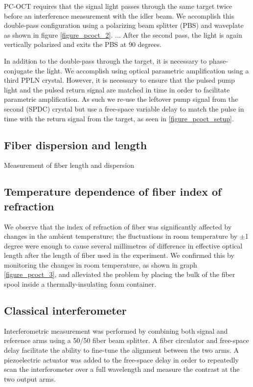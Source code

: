 PC-OCT requires that the signal light passes through the same target twice before an interference measurement with the idler beam. We accomplish this double-pass configuration using a polarizing beam splitter (PBS) and waveplate as shown in figure \ref{figure_pcoct_2}.
...
After the second pass, the light is again vertically polarized and exits the PBS at 90 degrees.

In addition to the double-pass through the target, it is necessary to phase-conjugate the light. We accomplish using optical parametric amplification using a third PPLN crystal. However, it is necessary to ensure that the pulsed pump light and the pulsed return signal are matched in time in order to facilitate parametric amplification. As such we re-use the leftover pump signal from the second (SPDC) crystal but use a free-space variable delay to match the pulse in time with the return signal from the target, as seen in \ref{figure_pcoct_setup}.

\subsection{Fiber dispersion and length}

Measurement of fiber length and dispersion

\subsection{Temperature dependence of fiber index of refraction}

We observe that the index of refraction of fiber was significantly affected by changes in the ambient temperature; the fluctuations in room temperature by $\pm$1 degree were enough to cause several millimetres of difference in effective optical length after the length of fiber used in the experiment. We confirmed this by monitoring the changes in room temperature, as shown in graph \ref{figure_pcoct_3}, and alleviated the problem by placing the bulk of the fiber spool inside a thermally-insulating foam container.

\subsection{Classical interferometer}

Interferometric measurement was performed by combining both signal and reference arms using a 50/50 fiber beam splitter. A fiber circulator and free-space delay facilitate the ability to fine-tune the alignment between the two arms. A piezoelectric actuator was added to the free-space delay in order to repeatedly scan the interferometer over a full wavelength and measure the contrast at the two output arms.

